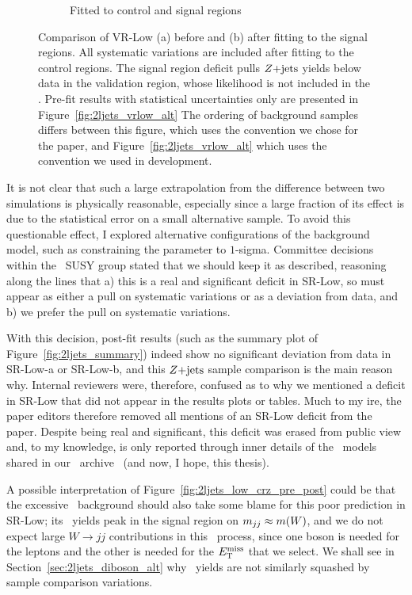 \begin{figure}[tp]
\begin{subfigure}{0.62\textwidth}
\caption{Fitted to control and signal regions}
\end{subfigure}
\caption[
Comparison of VR-Low before and after fitting to the signal regions
]{%
Comparison of VR-Low (a) before and (b) after fitting to the signal regions.
All systematic variations are included after fitting to the control regions.
The signal region deficit pulls $Z\mathrm{+jets}$ yields below data in the validation
region, whose likelihood is not included in the \heplikelihood.
Pre-fit results with statistical uncertainties only are presented in
Figure~\ref{fig:2ljets_vrlow_alt}
The ordering of background samples differs between this figure,
which uses the convention we chose for the paper, and
Figure~\ref{fig:2ljets_vrlow_alt} which uses the convention we used in
development.
}
\label{fig:2ljets_low_vrlow_pre_post}
\end{figure}

It is not clear that such a large extrapolation from the difference between
two simulations is physically reasonable, especially since a large fraction
of its effect is due to the statistical error on a small alternative sample.
To avoid this questionable effect, I explored alternative configurations
of the background model, such as constraining the parameter to $1$-sigma.
Committee decisions within the \atlas\ SUSY group stated that we should keep
it as described, reasoning along the lines that
a) this is a real and significant deficit in SR-Low, so must appear as either
a pull on systematic variations or as a deviation from data, and
b) we prefer the pull on systematic variations.

With this decision, post-fit results (such as the summary plot of
Figure~\ref{fig:2ljets_summary})
indeed show no significant deviation from data in SR-Low-a or SR-Low-b,
and this $Z\mathrm{+jets}$ sample comparison is the main reason why.
Internal reviewers were, therefore, confused as to why we mentioned a deficit
in SR-Low that did not appear in the results plots or tables.
Much to my ire, the paper editors therefore removed all mentions of an SR-Low
deficit from the paper.
Despite being real and significant, this deficit was erased from public view
and, to my knowledge, is only reported through inner details of
the \histfactory\ models shared in our \hepdata\ archive~\cite{hepdata.116034}
(and now, I hope, this thesis).

A possible interpretation of Figure~\ref{fig:2ljets_low_crz_pre_post} could be
that the excessive \diboson\ background should also take some blame for this
poor prediction in SR-Low;
its \diboson\ yields peak in the signal region on $m_{jj} \approx m(W)$, and
we do not expect large $W\to jj$ contributions in this \diboson\
process, since one boson is needed for the leptons and the other is needed for
the $E_\mathrm{T}^\mathrm{miss}$ that we select.
We shall see in Section~\ref{sec:2ljets_diboson_alt} why \diboson\ yields are
not similarly squashed by sample comparison variations.


